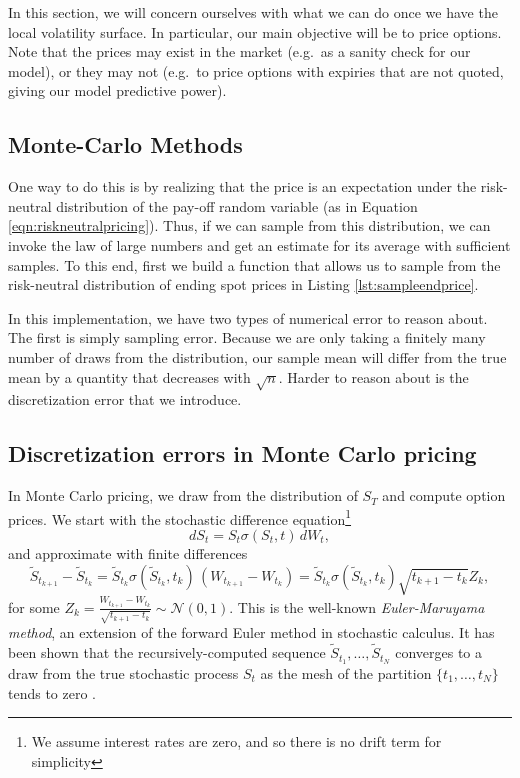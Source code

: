 \documentclass[12pt]{article}
\numberwithin{equation}{section}
\newcommand{\Norm}{\mathcal N}
\begin{document}
In this section, we will concern ourselves with what we can do once we have the
local volatility surface. In particular, our main objective will be to 
price options. Note that the prices may exist in the market (e.g.\ as a sanity
check for our model), or they may not (e.g.\ to price options with expiries that
are not quoted, giving our model predictive power).

\subsection{Monte-Carlo Methods}
\label{subsec:montecarlopricing}

One way to do this is by realizing that the price is an expectation under the
risk-neutral distribution of the pay-off random variable (as in Equation
\ref{eqn:riskneutralpricing}). Thus, if we can sample
from this distribution, we can invoke the law of large numbers and get an
estimate for its average with sufficient samples. To this end, first we build a
function that allows us to sample from the risk-neutral distribution of ending
spot prices in Listing \ref{lst:sampleendprice}.

In this implementation, we have two types of numerical error to reason about.
The first is simply sampling error. Because we are only taking a finitely many
number of draws from the distribution, our sample mean will differ from the true
mean by a quantity that decreases with $\sqrt{n}$. Harder to reason about is the
discretization error that we introduce. 



\subsection{Discretization errors in Monte Carlo pricing}
In Monte Carlo pricing, we draw from the distribution of $S_T$ and compute option prices. We start with the stochastic difference equation\footnote{We assume interest rates are zero, and so there is no drift term for simplicity} \[
dS_t = S_t \sigma(S_t,t) \, dW_t,
\]
and approximate with finite differences 
\begin{equation}
    \label{eq:euler-maruyama}
    \tilde S_{t_{k+1}} - \tilde S_{t_k} = \tilde S_{t_k} \sigma(\tilde S_{t_k}, t_k)\, (W_{t_{k+1}} - W_{t_k}) = \tilde S_{t_k} \sigma(\tilde S_{t_k}, t_k) \sqrt{t_{k+1}-t_k} Z_k,
\end{equation}
for some $Z_k = \frac{W_{t_{k+1}} - W_{t_k}}{\sqrt{t_{k+1}-t_k}} \sim \Norm(0,1)$. This is the well-known \emph{Euler-Maruyama method}, an extension of the forward Euler method in stochastic calculus. It has been shown that the recursively-computed sequence $\tilde S_{t_1},\ldots, \tilde S_{t_N}$ converges to a draw from the true stochastic process $S_t$ as the mesh of the partition $\{t_1,\ldots,t_N\}$ tends to zero \citep{dobrow2016introduction}.  
\end{document}
